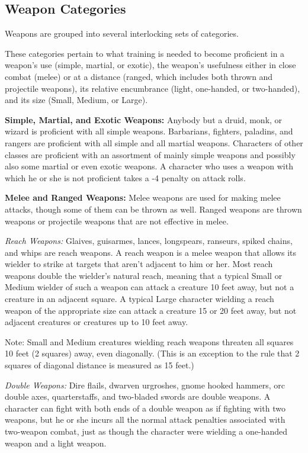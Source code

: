\subsection{Weapon Categories}
Weapons are grouped into several interlocking sets of categories.

These categories pertain to what training is needed to become proficient in a weapon's use (simple, martial, or exotic), the weapon's usefulness either in close combat (melee) or at a distance (ranged, which includes both thrown and projectile weapons), its relative encumbrance (light, one-handed, or two-handed), and its size (Small, Medium, or Large).

\textbf{Simple, Martial, and Exotic Weapons:} Anybody but a druid, monk, or wizard is proficient with all simple weapons. Barbarians, fighters, paladins, and rangers are proficient with all simple and all martial weapons. Characters of other classes are proficient with an assortment of mainly simple weapons and possibly also some martial or even exotic weapons. A character who uses a weapon with which he or she is not proficient takes a -4 penalty on attack rolls.

\textbf{Melee and Ranged Weapons:} Melee weapons are used for making melee attacks, though some of them can be thrown as well. Ranged weapons are thrown weapons or projectile weapons that are not effective in melee.

\textit{Reach Weapons:} Glaives, guisarmes, lances, longspears, ranseurs, spiked chains, and whips are reach weapons. A reach weapon is a melee weapon that allows its wielder to strike at targets that aren't adjacent to him or her. Most reach weapons double the wielder's natural reach, meaning that a typical Small or Medium wielder of such a weapon can attack a creature 10 feet away, but not a creature in an adjacent square. A typical Large character wielding a reach weapon of the appropriate size can attack a creature 15 or 20 feet away, but not adjacent creatures or creatures up to 10 feet away.

Note: Small and Medium creatures wielding reach weapons threaten all squares 10 feet (2 squares) away, even diagonally. (This is an exception to the rule that 2 squares of diagonal distance is measured as 15 feet.)

\textit{Double Weapons:} Dire flails, dwarven urgroshes, gnome hooked hammers, orc double axes, quarterstaffs, and two-bladed swords are double weapons. A character can fight with both ends of a double weapon as if fighting with two weapons, but he or she incurs all the normal attack penalties associated with two-weapon combat, just as though the character were wielding a one-handed weapon and a light weapon.

